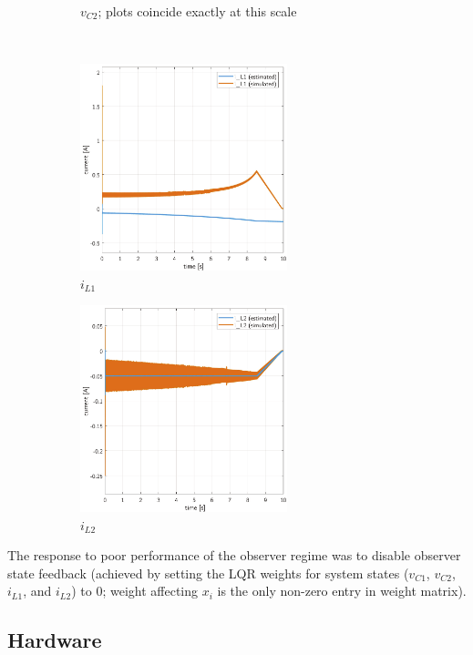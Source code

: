 \begin{figure}[H]
\begin{framed}
\begin{subfigure}[b]{0.45\textwidth}
    \caption{$v_{C2}$; plots coincide exactly at this scale}
    \label{}
    \end{subfigure}
    \\[11pt]
    \begin{subfigure}[b]{0.45\textwidth}
    \centering
    \includegraphics[height = 6cm]{figures/estimation/iL1_iL1b.pdf}
    \caption{$i_{L1}$}
    \label{}
    \end{subfigure}
    \hfill
    \begin{subfigure}[b]{0.45\textwidth}
    \centering
    \includegraphics[height = 6cm]{figures/estimation/iL2_iL2b.pdf}
    \caption{$i_{L2}$}
    \label{fig:estimating2last}
    \end{subfigure}
    \end{framed}
    \caption{}
    \label{fig:estimating2}
\end{figure}
The response to poor performance of the observer regime was to disable observer state feedback (achieved by setting the LQR weights for system states ($v_{C1}$, $v_{C2}$, $i_{L1}$, and $i_{L2}$) to 0; weight affecting $x_i$ is the only non-zero entry in weight matrix).
\subsection{Hardware}
